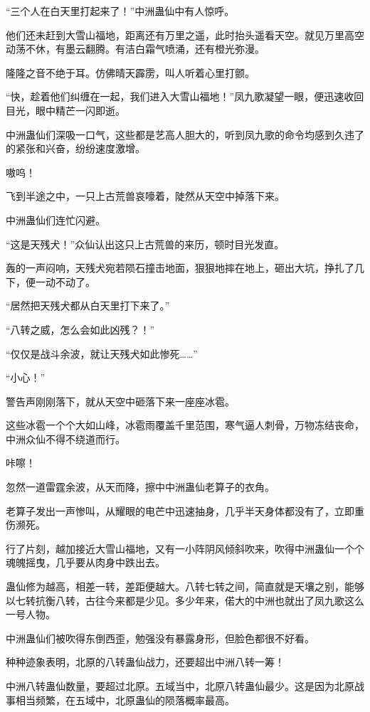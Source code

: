 \begin{this_body}
“三个人在白天里打起来了！”中洲蛊仙中有人惊呼。

他们还未赶到大雪山福地，距离还有万里之遥，此时抬头遥看天空。就见万里高空动荡不休，有墨云翻腾。有洁白霜气喷涌，还有橙光弥漫。

隆隆之音不绝于耳。仿佛晴天霹雳，叫人听着心里打颤。

“快，趁着他们纠缠在一起，我们进入大雪山福地！”凤九歌凝望一眼，便迅速收回目光，眼中精芒一闪即逝。

中洲蛊仙们深吸一口气，这些都是艺高人胆大的，听到凤九歌的命令均感到久违了的紧张和兴奋，纷纷速度激增。

嗷呜！

飞到半途之中，一只上古荒兽哀嚎着，陡然从天空中掉落下来。

中洲蛊仙们连忙闪避。

“这是天残犬！”众仙认出这只上古荒兽的来历，顿时目光发直。

轰的一声闷响，天残犬宛若陨石撞击地面，狠狠地摔在地上，砸出大坑，挣扎了几下，便一动不动了。

“居然把天残犬都从白天里打下来了。”

“八转之威，怎么会如此凶残？！”

“仅仅是战斗余波，就让天残犬如此惨死……”

“小心！”

警告声刚刚落下，就从天空中砸落下来一座座冰雹。

这些冰雹一个个大如山峰，冰雹雨覆盖千里范围，寒气逼人刺骨，万物冻结丧命，中洲众仙不得不绕道而行。

咔嚓！

忽然一道雷霆余波，从天而降，擦中中洲蛊仙老算子的衣角。

老算子发出一声惨叫，从耀眼的电芒中迅速抽身，几乎半天身体都没有了，立即重伤濒死。

行了片刻，越加接近大雪山福地，又有一小阵阴风倾斜吹来，吹得中洲蛊仙一个个魂魄摇曳，几乎要从肉身中跌出去。

蛊仙修为越高，相差一转，差距便越大。八转七转之间，简直就是天壤之别，能够以七转抗衡八转，古往今来都是少见。多少年来，偌大的中洲也就出了凤九歌这么一号人物。

中洲蛊仙们被吹得东倒西歪，勉强没有暴露身形，但脸色都很不好看。

种种迹象表明，北原的八转蛊仙战力，还要超出中洲八转一筹！

中洲八转蛊仙数量，要超过北原。五域当中，北原八转蛊仙最少。这是因为北原战事相当频繁，在五域中，北原蛊仙的陨落概率最高。


\end{this_body}
